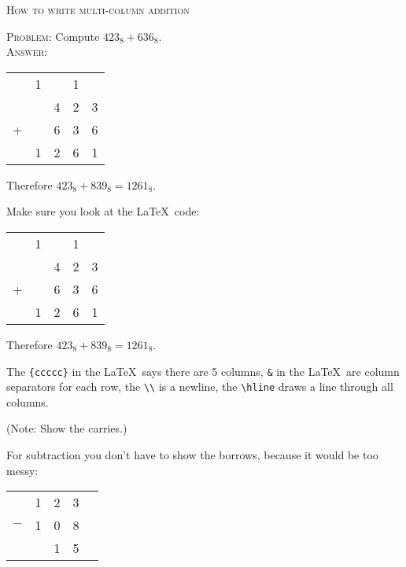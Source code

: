 \textsc{How to write multi-column addition}

\textsc{Problem:} Compute $423_{8} + 636_{8}$.
\\
\textsc{Answer:}\vspace{-2mm}
\begin{answerlong}
\begin{longtable}{ccccc}
  & 1 &   & 1 &   \\
  &   & 4 & 2 & 3 \\
+ &   & 6 & 3 & 6 \\ \hline
  & 1 & 2 & 6 & 1 \\ \hline
\end{longtable}
Therefore $423_{8} + 839_{8} = 1261_{8}$.
\end{answerlong}

Make sure you look at the \LaTeX\ code:
\begin{console}[fontsize=\footnotesize]
\begin{longtable}{ccccc}
  & 1 &   & 1 &   \\
  &   & 4 & 2 & 3 \\
+ &   & 6 & 3 & 6 \\ \hline
  & 1 & 2 & 6 & 1 \\ \hline
\end{longtable}
Therefore $423_{8} + 839_{8} = 1261_{8}$.
\end{console}
The
\verb!{ccccc}! in the \LaTeX\ says there are 5 columns,
\verb!&! in the \LaTeX\ are column separators for each row,
the \verb!\\! is a newline, the \verb!\hline! draws a line through all columns.


(Note: Show the carries.)

For subtraction you don't have to show the borrows, because it would be
too messy:
\begin{longtable}{ccccc}
    & 1 & 2 & 3 \\
$-$ & 1 & 0 & 8 \\ \hline
    &   & 1 & 5 \\ \hline
\end{longtable}
